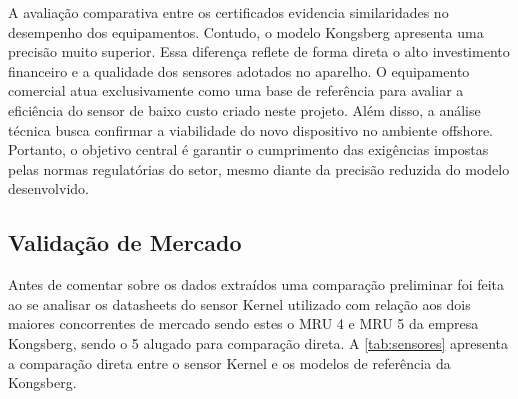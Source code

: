 \documentclass[a4paper, 12pt]{article}
\begin{document}
        A avaliação comparativa entre os certificados evidencia similaridades no desempenho dos equipamentos. Contudo, o modelo Kongsberg apresenta uma precisão muito superior. Essa diferença reflete de forma direta o alto investimento financeiro e a qualidade dos sensores adotados no aparelho. O equipamento comercial atua exclusivamente como uma base de referência para avaliar a eficiência do sensor de baixo custo criado neste projeto. Além disso, a análise técnica busca confirmar a viabilidade do novo dispositivo no ambiente offshore. Portanto, o objetivo central é garantir o cumprimento das exigências impostas pelas normas regulatórias do setor, mesmo diante da precisão reduzida do modelo desenvolvido.


    \subsection{Validação de Mercado}
        Antes de comentar sobre os dados extraídos uma comparação preliminar foi feita ao se analisar os datasheets do sensor Kernel utilizado com relação aos dois maiores concorrentes de mercado sendo estes o MRU 4 e MRU 5 da empresa Kongsberg, sendo o 5 alugado para comparação direta. A \autoref{tab:sensores} apresenta a comparação direta entre o sensor Kernel e os modelos de referência da Kongsberg.
\end{document}
